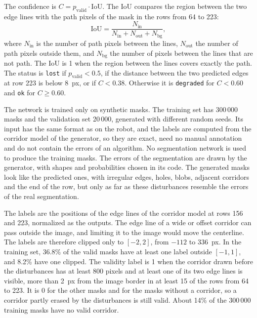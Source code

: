 The confidence is $C=p_{\mathrm{valid}}\cdot\mathrm{IoU}$. The IoU compares the region between the two edge lines with the path pixels of the mask in the rows from 64 to 223:
\begin{equation}
    \mathrm{IoU}=\frac{N_{\mathrm{in}}}{N_{\mathrm{in}}+N_{\mathrm{out}}+N_{\mathrm{bg}}},
    \label{eq:c5_edgenet_iou}
\end{equation}
where $N_{\mathrm{in}}$ is the number of path pixels between the lines, $N_{\mathrm{out}}$ the number of path pixels outside them, and $N_{\mathrm{bg}}$ the number of pixels between the lines that are not path. The IoU is 1 when the region between the lines covers exactly the path. The status is \texttt{lost} if $p_{\mathrm{valid}}<0.5$, if the distance between the two predicted edges at row 223 is below 8~px, or if $C<0.38$. Otherwise it is \texttt{degraded} for $C<0.60$ and \texttt{ok} for $C\geq0.60$.

The network is trained only on synthetic masks. The training set has 300\,000 masks and the validation set 20\,000, generated with different random seeds. Its input has the same format as on the robot, and the labels are computed from the corridor model of the generator, so they are exact, need no manual annotation and do not contain the errors of an algorithm. No segmentation network is used to produce the training masks. The errors of the segmentation are drawn by the generator, with shapes and probabilities chosen in its code. The generated masks look like the predicted ones, with irregular edges, holes, blobs, adjacent corridors and the end of the row, but only as far as these disturbances resemble the errors of the real segmentation.

The labels are the positions of the edge lines of the corridor model at rows 156 and 223, normalized as the outputs. The edge line of a wide or offset corridor can pass outside the image, and limiting it to the image would move the centerline. The labels are therefore clipped only to $[-2,2]$, from $-112$ to 336~px. In the training set, 36.8\% of the valid masks have at least one label outside $[-1,1]$, and 8.2\% have one clipped. The validity label is 1 when the corridor drawn before the disturbances has at least 800 pixels and at least one of its two edge lines is visible, more than 2~px from the image border in at least 15 of the rows from 64 to 223. It is 0 for the other masks and for the masks without a corridor, so a corridor partly erased by the disturbances is still valid. About 14\% of the 300\,000 training masks have no valid corridor.

